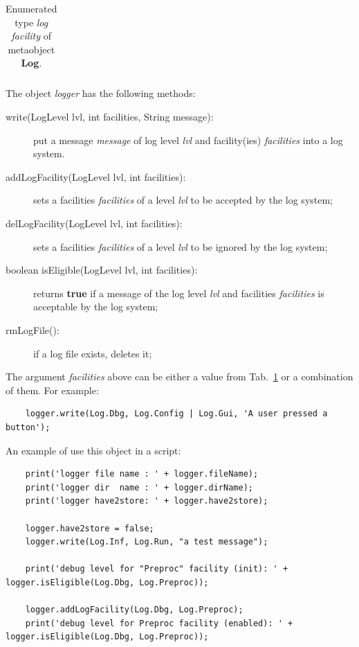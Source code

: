 \documentclass [10pt,letterpaper]{report}
\begin{document}
{{\begin{table}[htb]
\begin{tabular}{lp{}}
\hline
\end{tabular}
\caption{Enumerated type {\sl log facility} of metaobject {\bf Log}.}
\label{tab-scr-logger-facilities}
\end{table}



\noindent
The object {\sl logger} has the following methods:

\begin{description}
\item[write(LogLevel lvl, int facilities, String message):] put a message {\sl message} of log level
    {\sl lvl} and facility(ies) {\sl facilities} into a log system.

\item[addLogFacility(LogLevel lvl, int facilities):] sets a facilities {\sl facilities} of a level
    {\sl lvl} to be accepted by the log system;

\item[delLogFacility(LogLevel lvl, int facilities):] sets a facilities {\sl facilities} of a level
    {\sl lvl} to be ignored by the log system;

\item[boolean isEligible(LogLevel lvl, int facilities):] returns {\bf true} if a message of the log
    level {\sl lvl} and facilities {\sl facilities} is acceptable by the log system;

\item[rmLogFile():] if a log file exists, deletes it;

\end{description}
\noindent
The argument {\sl facilities} above can be either a value from Tab.~\ref{tab-scr-logger-facilities}
or a combination of them. For example:
\begin{verbatim}
    logger.write(Log.Dbg, Log.Config | Log.Gui, 'A user pressed a button');
\end{verbatim}

\noindent
An example of use this object in a script:
{\small\begin{verbatim}
    print('logger file name : ' + logger.fileName);
    print('logger dir  name : ' + logger.dirName);
    print('logger have2store: ' + logger.have2store);

    logger.have2store = false;
    logger.write(Log.Inf, Log.Run, "a test message");

    print('debug level for "Preproc" facility (init): ' + logger.isEligible(Log.Dbg, Log.Preproc));

    logger.addLogFacility(Log.Dbg, Log.Preproc);
    print('debug level for Preproc facility (enabled): ' + logger.isEligible(Log.Dbg, Log.Preproc));


\end{verbatim}}}}
\end{document}
